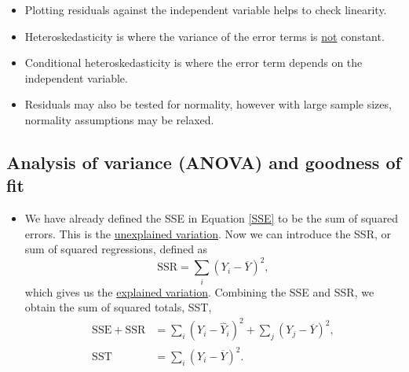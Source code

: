 \documentclass[../notes_compiled.tex]{subfiles}
\begin{document}
\begin{itemize}
\begin{align}
\widehat{b}_{1}&=\frac{\Cov(X,Y)}{{\sigma_{X}}^{2}}, \\
\widehat{b}_{0} &= \overline{Y}-\widehat{b}_{1}\overline{X}.
\end{align}
The assumptions of linear regression are that;
\begin{itemize}
\item Linear relationship is present between variables;
\item Variance of error / residual is constant; (Homoskedasticity)
\item Error terms are independently distributed;
\item Error terms are normally distributed.
\end{itemize}
\item Plotting residuals against the independent variable helps to check linearity.
\item Heteroskedasticity is where the variance of the error terms is \underline{not} constant.
\item Conditional heteroskedasticity is where the error term depends on the independent variable. 
\item Residuals may also be tested for normality, however with large sample sizes, normality assumptions may be relaxed.
\end{itemize}

\subsection{Analysis of variance (ANOVA) and goodness of fit}
\begin{itemize}
\item We have already defined the SSE in Equation \ref{SSE} to be the sum of squared errors. This is the \underline{unexplained variation}. Now we can introduce the SSR, or sum of squared regressions, defined as
\begin{equation}
\mathrm{SSR} =\sum_{i}(Y_{i}-\overline{Y})^{2},
\end{equation}
which gives us the \underline{explained variation}. Combining the SSE and SSR, we obtain the sum of squared totals, SST,
\begin{align}
\mathrm{SSE} + \mathrm{SSR} &= \sum_{i}(Y_{i}-\widehat{Y}_{i})^{2} + \sum_{j}(Y_{j}-\overline{Y})^{2}, \\
\mathrm{SST} &= \sum_{i}(Y_{i}-\overline{Y})^{2}.
\end{align}
\end{itemize}
\end{document}
